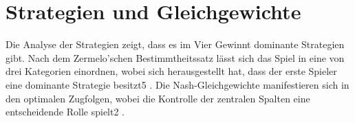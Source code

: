 \section{Strategien und Gleichgewichte}
Die Analyse der Strategien zeigt, dass es im Vier Gewinnt dominante Strategien gibt. Nach dem Zermelo'schen Bestimmtheitssatz lässt sich das Spiel in eine von drei Kategorien einordnen, wobei sich herausgestellt hat, dass der erste Spieler eine dominante Strategie besitzt5
. Die Nash-Gleichgewichte manifestieren sich in den optimalen Zugfolgen, wobei die Kontrolle der zentralen Spalten eine entscheidende Rolle spielt2
.


	